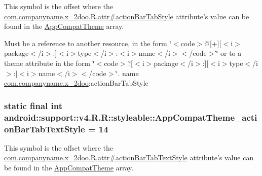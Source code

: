 This symbol is the offset where the \hyperlink{classcom_1_1companyname_1_1x__2doo_1_1_r_1_1attr_ea2eb2e736d7bed9fe931b868e54ab6e}{com.companyname.x\_\-2doo.R.attr\#actionBarTabStyle} attribute's value can be found in the \hyperlink{classandroid_1_1support_1_1v4_1_1_r_1_1styleable_0873e92ba21076bb5a4aeadeb7f5779f}{AppCompatTheme} array.

Must be a reference to another resource, in the form \char`\"{}$<$code$>$@\mbox{[}+\mbox{]}\mbox{[}$<$i$>$package$<$/i$>$:\mbox{]}$<$i$>$type$<$/i$>$:$<$i$>$name$<$/i$>$$<$/code$>$\char`\"{} or to a theme attribute in the form \char`\"{}$<$code$>$?\mbox{[}$<$i$>$package$<$/i$>$:\mbox{]}\mbox{[}$<$i$>$type$<$/i$>$:\mbox{]}$<$i$>$name$<$/i$>$$<$/code$>$\char`\"{}.  name \hyperlink{namespacecom_1_1companyname_1_1x__2doo}{com.companyname.x\_\-2doo}:actionBarTabStyle \hypertarget{classandroid_1_1support_1_1v4_1_1_r_1_1styleable_638a87bf99ca4d6078c162044ec4dbbc}{
\subsubsection[{AppCompatTheme\_\-actionBarTabTextStyle}]{\setlength{\rightskip}{0pt plus 5cm}static final int android::support::v4.R.R::styleable::AppCompatTheme\_\-actionBarTabTextStyle = 14}}
\label{classandroid_1_1support_1_1v4_1_1_r_1_1styleable_638a87bf99ca4d6078c162044ec4dbbc}


This symbol is the offset where the \hyperlink{classcom_1_1companyname_1_1x__2doo_1_1_r_1_1attr_384ff21c828ae25ca523d215bf59c157}{com.companyname.x\_\-2doo.R.attr\#actionBarTabTextStyle} attribute's value can be found in the \hyperlink{classandroid_1_1support_1_1v4_1_1_r_1_1styleable_0873e92ba21076bb5a4aeadeb7f5779f}{AppCompatTheme} array.


